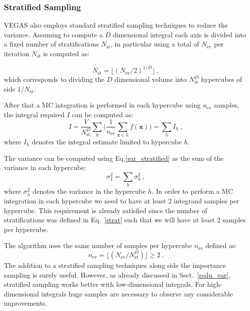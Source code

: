 \documentclass[../main/main.tex]{subfiles}
\begin{document}
\subsubsection{Stratified Sampling}
VEGAS also employs standard stratified sampling techniques to reduce the variance.
Assuming to compute a $D$ dimensional integral each axis is divided into a fixed number of stratifications $N_\text{st}$, in particular using a total of $N_{\text{ev}}$ per iteration $N_\text{st}$ is computed as:

\begin{equation}
	\label{strat}
	N_\text{st} = \lfloor (N_\text{ev}/2)^{1/D}\rfloor \ ,
\end{equation}
which corresponds to dividing the $D$ dimensional volume into $N_\text{st}^D$ hypercubes of side $1/N_\text{st}$.

After that a MC integration is performed in each hypercube using $n_\text{ev}$ samples, the integral required $I$ can be computed as:
\begin{equation}
	\label{i str}
	I = \frac{V}{N_\text{st}^D}\sum_h \bigg(\frac{1}{n_\text{ev}} \sum_{\textbf{x} \in h} f(\textbf{x}) \bigg) = \sum_h I_h \ ,
\end{equation}
where $I_h$ denotes the integral estimate limited to hypercube $h$.

The variance can be computed using Eq.\eqref{var_stratified} as the sum of the variance in each hypercube:
\begin{equation}
	\label{sigma str}
	\sigma^2_I = \sum_h \sigma^2_h \ ,
\end{equation}
where $\sigma^2_h$ denotes the variance in the hypercube $h$.
In order to perform a MC integration in each hypercube we need to have at least $2$ integrand samples per hypercube. This requirement is already satisfied since the number of stratifications was defined in Eq.~\ref{strat} such that we will have at least 2 samples per hypercube. 

The algorithm uses the same number of samples per hypercube $n_\text{ev}$ defined as:
\begin{equation}
	n_\text{ev} = \lfloor (N_\text{ev}/N_\text{st}^D)\rfloor \ge 2 \ .
\end{equation} 
The addition to a stratified sampling techniques along side the importance sampling is surely useful.
However, as already discussed in Sect.~\ref{redu_var}, stratified sampling works better with low-dimensional integrals. For 
high-dimensional integrals huge samples are necessary to observe any considerable improvements.
\end{document}

